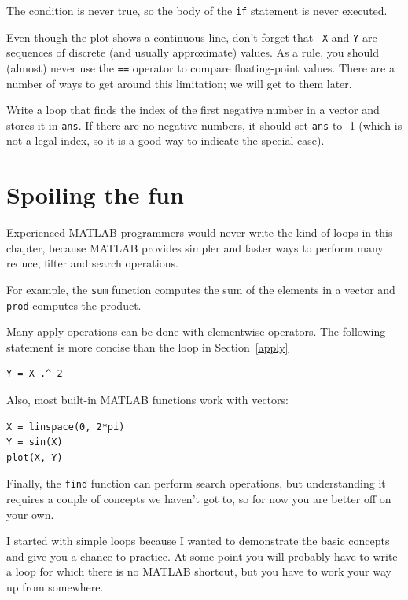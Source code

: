 \documentclass{book}
\begin{document}
The condition is never true, so the body of the {\tt if} statement
is never executed.

Even though the plot shows a continuous line, don't forget that {\tt
X} and {\tt Y} are sequences of discrete (and usually approximate)
values.  As a rule, you should (almost) never use the {\tt ==}
operator to compare floating-point values.  There are a number of ways
to get around this limitation; we will get to them later.

\begin{ex}
Write a loop that finds the index of the first
negative number in a vector and stores it in {\tt ans}.  If there are
no negative numbers, it should set {\tt ans} to -1 (which is not
a legal index, so it is a good way to indicate the special case).
\end{ex}



\section{Spoiling the fun}

Experienced MATLAB programmers would never write the kind of loops
in this chapter, because MATLAB provides simpler and faster ways to
perform many reduce, filter and search operations.

For example, the {\tt sum} function computes the sum of the elements
in a vector and {\tt prod} computes the product.

Many apply operations can be done with elementwise operators.  The
following statement is more concise than the loop in
Section~\ref{apply}

\begin{verbatim}
Y = X .^ 2
\end{verbatim}

Also, most built-in MATLAB functions work with vectors:

\begin{verbatim}
X = linspace(0, 2*pi)
Y = sin(X)
plot(X, Y)
\end{verbatim}

Finally, the {\tt find} function can perform search operations, but
understanding it requires a couple of concepts we haven't got to, so
for now you are better off on your own.

I started with simple loops because I wanted to demonstrate the basic
concepts and give you a chance to practice.  At some point you will
probably have to write a loop for which there is no
MATLAB shortcut, but you have to work your way up from somewhere.
\end{document}
